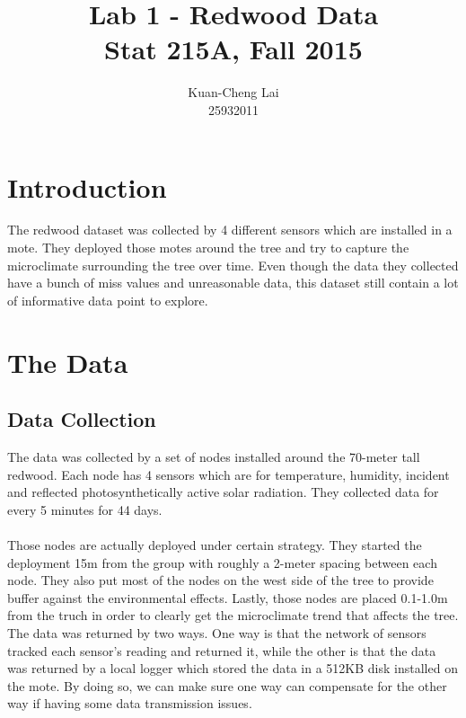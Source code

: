 \documentclass{article}\usepackage[]{graphicx}\usepackage[]{color}
\begin{document}
\title{Lab 1 - Redwood Data\\
Stat 215A, Fall 2015}
\author{Kuan-Cheng Lai\\25932011}

\maketitle

\section{Introduction}
The redwood dataset was collected by 4 different sensors which are installed in a mote. They deployed those motes around the tree and try to capture the microclimate surrounding the tree over time. Even though the data they collected have a bunch of miss values and unreasonable data, this dataset still contain a lot of informative data point to explore.
\section{The Data}
\subsection{Data Collection}
The data was collected by a set of nodes installed around the 70-meter tall redwood. Each node has 4 sensors which are for temperature, humidity, incident and reflected photosynthetically active solar radiation. They collected data for every 5 minutes for 44 days.\\
\\
Those nodes are actually deployed under certain strategy. They started the deployment 15m from the group with roughly a 2-meter spacing between each node. They also put most of the nodes on the west side of the tree to provide buffer against the environmental effects. Lastly, those nodes are placed 0.1-1.0m from the truch in order to clearly get the microclimate trend that affects the tree. \\

The data was returned by two ways. One way is that the network of sensors tracked each sensor's reading and returned it, while the other is that the data was returned by a local logger which stored the data in a 512KB disk installed on the mote. By doing so, we can make sure one way can compensate for the other way if having some data transmission issues. 
\end{document}
